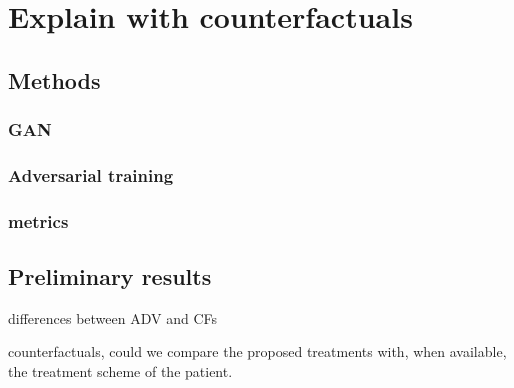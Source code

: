 \documentclass[../main.tex]{subfiles}
\begin{document}
\chapter{Explain with counterfactuals}\label{chap:counterfactuals}
\minitocpage
\section{Methods}
\subsection{GAN}
\subsection{Adversarial training}
\subsection{metrics}
\section{Preliminary results}

 \cite{SzegedyZSBEGF13}

 

 differences between ADV and CFs





 counterfactuals, could we compare the proposed treatments with, when available, the treatment scheme of the patient.
\end{document}
